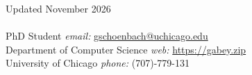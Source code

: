 
\hfill
Updated November 2026
\\
\\
\noindent PhD Student \hfill{\emph{email:} \url{gschoenbach@uchicago.edu}}\\
\noindent Department of Computer Science \hfill{\emph{web:} \url{https://gabey.zip}}\\
\noindent University of Chicago \hfill{\emph{phone:} (707)-779-131}



\noindent\makebox[\linewidth]{\rule{\textwidth}{0.4pt}}


